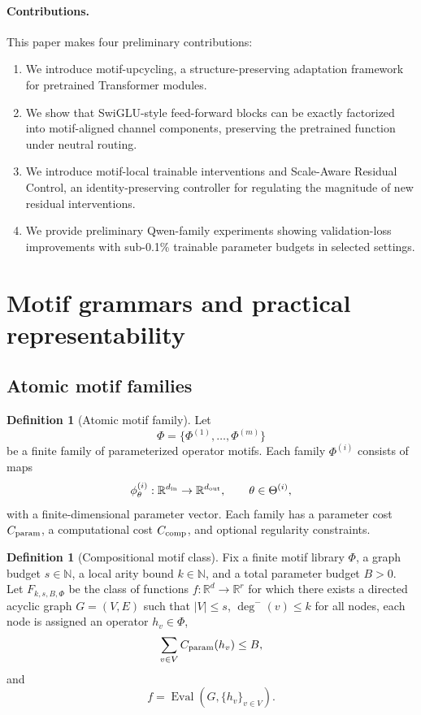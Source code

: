 \documentclass[11pt]{article}
\theoremstyle{definition}
\newtheorem{definition}[theorem]{Definition}
\newcommand{\R}{\mathbb{R}}
\newcommand{\Eval}{\operatorname{Eval}}
\begin{document}
\paragraph{Contributions.}
This paper makes four preliminary contributions:
\begin{enumerate}
  \item We introduce motif-upcycling, a structure-preserving adaptation framework for pretrained Transformer modules.
  \item We show that SwiGLU-style feed-forward blocks can be exactly factorized into motif-aligned channel components, preserving the pretrained function under neutral routing.
  \item We introduce motif-local trainable interventions and Scale-Aware Residual Control, an identity-preserving controller for regulating the magnitude of new residual interventions.
  \item We provide preliminary Qwen-family experiments showing validation-loss improvements with sub-0.1\% trainable parameter budgets in selected settings.
\end{enumerate}

\section{Motif grammars and practical representability}


\subsection{Atomic motif families}

\begin{definition}[Atomic motif family]
Let
\[
  \Phi=\{\Phi^{(1)},\ldots,\Phi^{(m)}\}
\]
be a finite family of parameterized operator motifs. Each family \(\Phi^{(i)}\) consists of maps
\[
  \phi^{(i)}_\theta : \R^{d_{\rm in}}\to \R^{d_{\rm out}},\qquad \theta\in\Theta^{(i)},
\]
with a finite-dimensional parameter vector. Each family has a parameter cost \(C_{\rm param}\), a computational cost \(C_{\rm comp}\), and optional regularity constraints.
\end{definition}

\begin{definition}[Compositional motif class]
Fix a finite motif library \(\Phi\), a graph budget \(s\in\mathbb N\), a local arity bound \(k\in\mathbb N\), and a total parameter budget \(B>0\). Let \(F_{k,s,B,\Phi}\) be the class of functions \(f:\R^d\to\R^r\) for which there exists a directed acyclic graph \(G=(V,E)\) such that \(|V|\le s\), \(\deg^-(v)\le k\) for all nodes, each node is assigned an operator \(h_v\in\Phi\),
\[
  \sum_{v\in V} C_{\rm param}(h_v)\le B,
\]
and
\[
  f=\Eval(G,\{h_v\}_{v\in V}).
\]
\end{definition}
\end{document}
